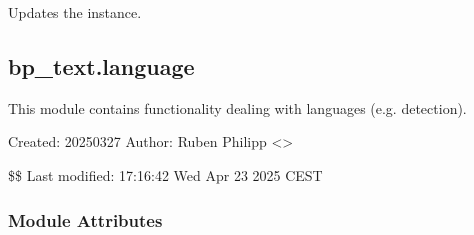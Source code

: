 \documentclass[letterpaper,10pt,english]{sphinxmanual}
\begin{document}
\begin{fulllineitems}

\begin{fulllineitems}
\label{\detokenize{generated/bp_text.page:bp_text.page.Page.text}}
\pysigstartsignatures
\pysigline
{}
\pysigstopsignatures
\end{fulllineitems}


\begin{fulllineitems}
\label{\detokenize{generated/bp_text.page:bp_text.page.Page.update}}
\pysigstartsignatures
\pysiglinewithargsret
{}
{}
{}
\pysigstopsignatures
\sphinxAtStartPar
Updates the instance.

\end{fulllineitems}


\end{fulllineitems}


\sphinxstepscope


\subsection{bp\_text.language}
\label{\detokenize{generated/bp_text.language:module-bp_text.language}}\label{\detokenize{generated/bp_text.language:bp-text-language}}\label{\detokenize{generated/bp_text.language::doc}}
\sphinxAtStartPar
This module contains functionality dealing with languages (e.g. detection).

\sphinxAtStartPar
Created: 2025\sphinxhyphen{}03\sphinxhyphen{}27
Author: Ruben Philipp \textless{}\textgreater{}

\sphinxAtStartPar
\$\$ Last modified:  17:16:42 Wed Apr 23 2025 CEST
\subsubsection*{Module Attributes}
\end{document}
